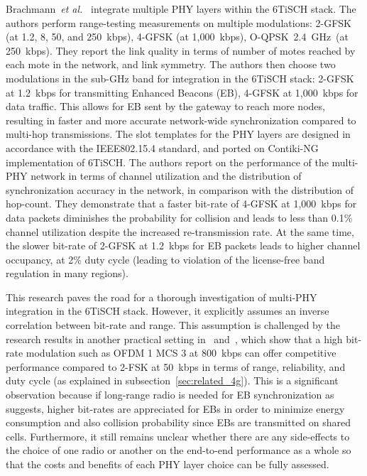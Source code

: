 \documentclass[sensors,article,submit,moreauthors,pdftex]{Definitions/mdpi}
\newcommand{\oqpsk}         {O-QPSK~2.4~GHz}
\newcommand{\etal}          {\textit{et al.}}
\begin{document}
Brachmann~\etal~\cite{brachmann19ieee} integrate multiple PHY layers within the 6TiSCH stack.
The authors perform range-testing measurements on multiple modulations:
     2-GFSK (at 1.2, 8, 50, and 250~kbps),
     4-GFSK (at 1,000~kbps),
     \oqpsk\ (at   250~kbps). 
They report the link quality in terms of number of motes reached by each mote in the network, and link symmetry.
The authors then choose two modulations in the sub-GHz band for integration in the 6TiSCH stack:
    2-GFSK at 1.2~kbps for transmitting Enhanced Beacons (EB),
    4-GFSK at 1,000~kbps for data traffic. 
This allows for EB sent by the gateway to reach more nodes, resulting in faster and more accurate network-wide synchronization compared to multi-hop transmissions. 
The slot templates for the PHY layers are designed in accordance with the IEEE802.15.4 standard,
    and ported on Contiki-NG implementation of 6TiSCH. 
The authors report on the performance of the multi-PHY network in terms of channel utilization and the distribution of synchronization accuracy in the network, in comparison with the distribution of hop-count. 
They demonstrate that a faster bit-rate of 4-GFSK at 1,000~kbps for data packets diminishes the probability for collision and leads to less than 0.1\% channel utilization despite the increased re-transmission rate.
At the same time, the slower bit-rate of 2-GFSK at 1.2~kbps for EB packets leads to higher channel occupancy,
    at 2\% duty cycle (leading to violation of the license-free band regulation in many regions).

This research paves the road for a thorough investigation of multi-PHY integration in the 6TiSCH stack.
However, it explicitly assumes an inverse correlation between bit-rate and range.
This assumption is challenged by the research results in another practical setting in~\cite{munoz18overview} and~\cite{munoz18evaluation}, which show that a high bit-rate modulation such as OFDM 1 MCS 3 at 800~kbps can offer competitive performance compared to 2-FSK at 50~kbps in terms of range, reliability, and duty cycle (as explained in subsection~\ref{sec:related_4g}).
This is a significant observation because if long-range radio is needed for EB synchronization as~\cite{brachmann19ieee} suggests, higher bit-rates are appreciated for EBs in order to minimize energy consumption and also collision probability since EBs are transmitted on shared cells. 
Furthermore, it still remains unclear whether there are any side-effects to the choice of one radio or another  on the end-to-end performance as a whole so that the costs and benefits of each PHY layer choice can be fully assessed.
\end{document}
